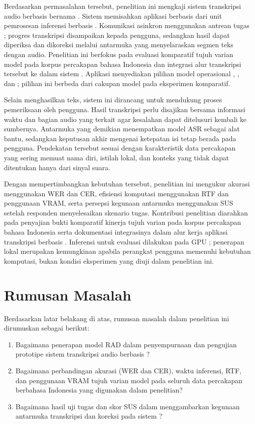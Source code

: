Berdasarkan permasalahan tersebut, penelitian ini mengkaji sistem transkripsi audio berbasis  bernama \namasistem. Sistem memisahkan aplikasi berbasis  dari unit pemrosesan inferensi berbasis . Komunikasi asinkron menggunakan antrean tugas ; progres transkripsi disampaikan kepada pengguna, sedangkan hasil dapat diperiksa dan dikoreksi melalui antarmuka yang menyelaraskan segmen teks dengan audio. Penelitian ini berfokus pada evaluasi komparatif tujuh varian model  pada korpus percakapan bahasa Indonesia dan integrasi alur transkripsi tersebut ke dalam sistem . Aplikasi menyediakan pilihan model operasional , , dan ; pilihan ini berbeda dari cakupan model pada eksperimen komparatif.

Selain menghasilkan teks, sistem ini dirancang untuk mendukung proses pemeriksaan oleh pengguna. Hasil transkripsi perlu disajikan bersama informasi waktu dan bagian audio yang terkait agar kesalahan dapat ditelusuri kembali ke sumbernya. Antarmuka yang demikian menempatkan model ASR sebagai alat bantu, sedangkan keputusan akhir mengenai ketepatan isi tetap berada pada pengguna. Pendekatan tersebut sesuai dengan karakteristik data percakapan yang sering memuat nama diri, istilah lokal, dan konteks yang tidak dapat ditentukan hanya dari sinyal suara.

Dengan mempertimbangkan kebutuhan tersebut, penelitian ini mengukur akurasi menggunakan WER dan CER, efisiensi komputasi menggunakan RTF dan penggunaan VRAM, serta persepsi kegunaan antarmuka menggunakan SUS setelah responden menyelesaikan skenario tugas. Kontribusi penelitian diarahkan pada penyajian bukti komparatif kinerja tujuh varian  pada korpus percakapan bahasa Indonesia serta dokumentasi integrasinya dalam alur kerja aplikasi transkripsi berbasis . Inferensi untuk evaluasi dilakukan pada GPU ; penerapan lokal merupakan kemungkinan  apabila perangkat pengguna memenuhi kebutuhan komputasi, bukan kondisi eksperimen yang diuji dalam penelitian ini.

\section{Rumusan Masalah}
Berdasarkan latar belakang di atas, rumusan masalah dalam penelitian ini dirumuskan sebagai berikut:
\begin{enumerate}
    \item Bagaimana penerapan model RAD dalam penyempurnaan dan pengujian prototipe sistem transkripsi audio berbasis  \namasistem?
    \item Bagaimana perbandingan akurasi (WER dan CER), waktu inferensi, RTF, dan penggunaan VRAM tujuh varian model  pada seluruh data percakapan berbahasa Indonesia yang digunakan dalam penelitian?
    \item Bagaimana hasil uji tugas dan skor SUS dalam menggambarkan kegunaan antarmuka transkripsi dan koreksi pada sistem \namasistem?
\end{enumerate}

